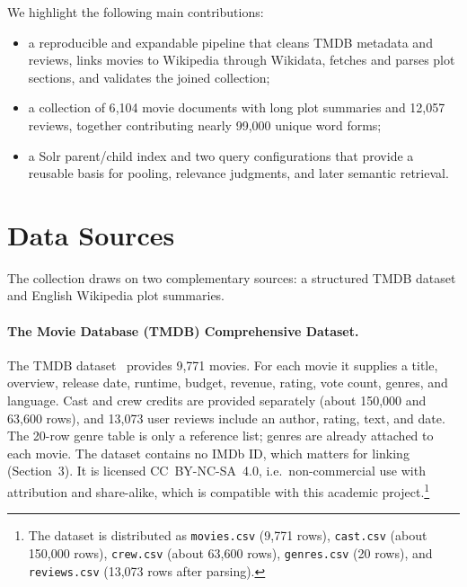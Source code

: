 \documentclass[sigconf]{acmart}
\begin{document}
We highlight the following main contributions:
\begin{itemize}
  \item a reproducible and expandable pipeline that cleans TMDB metadata and reviews,
    links movies to Wikipedia through Wikidata, fetches and parses plot sections, and
    validates the joined collection;
  \item a collection of 6{,}104 movie documents with long plot summaries and 12{,}057
    reviews, together contributing nearly 99{,}000 unique word forms;
  \item a Solr parent/child index and two query configurations that provide a reusable
    basis for pooling, relevance judgments, and later semantic retrieval.
\end{itemize}

\section{Data Sources}
The collection draws on two complementary sources: a structured TMDB dataset and
English Wikipedia plot summaries.

\paragraph{The Movie Database (TMDB) Comprehensive Dataset.}
The TMDB dataset~\cite{tmdb-kaggle,tmdb-api} provides 9{,}771 movies. For each movie it
supplies a title, overview, release date, runtime, budget, revenue, rating, vote count,
genres, and language. Cast and crew credits are provided separately (about 150{,}000 and
63{,}600 rows), and 13{,}073 user reviews include an author, rating, text, and date. The
20-row genre table is only a reference list; genres are already attached to each movie.
The dataset contains no IMDb ID, which matters for linking (Section~3). It is licensed
CC~BY-NC-SA~4.0, i.e.\ non-commercial use with attribution and share-alike, which is
compatible with this academic project.\footnote{The dataset is distributed as
\texttt{movies.csv} (9{,}771 rows), \texttt{cast.csv} (about 150{,}000 rows),
\texttt{crew.csv} (about 63{,}600 rows), \texttt{genres.csv} (20 rows), and
\texttt{reviews.csv} (13{,}073 rows after parsing).}
\end{document}
